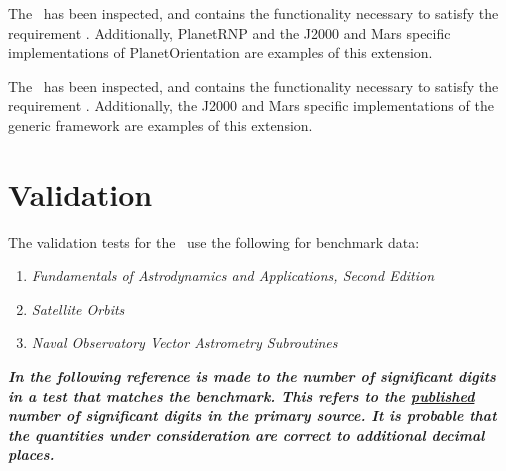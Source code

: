 \label{inspect:orientation_extension}
The \ModelDesc\ has been inspected, and contains the functionality necessary to
satisfy the requirement .
Additionally, PlanetRNP and the J2000 and Mars specific implementations of
PlanetOrientation are examples of this extension.

\label{inspect:extension}
The \ModelDesc\ has been inspected, and contains the functionality necessary to
satisfy the requirement . Additionally, the J2000
and Mars specific implementations of the generic framework are examples of this
extension.

\section{Validation}
The validation tests for the \ModelDesc\ use the following
for benchmark data:
\\      \newline
\begin{enumerate}
\item{\em Fundamentals of Astrodynamics and Applications, Second Edition} 
      \cite{VMcC} \label{test:bm1}
\item{\em Satellite Orbits} \cite{MG}\label{test:bm2}
\item{\em Naval Observatory Vector Astrometry Subroutines} 
      \cite{NOVAS}\label{test:bm4}
\end{enumerate}
{\em\bf In the following reference is made to the number of significant
digits in a test that matches the benchmark.  This refers to the
\underline{published} number of significant digits in the primary source. 
It is probable that the quantities under consideration are correct to 
additional decimal places.}

